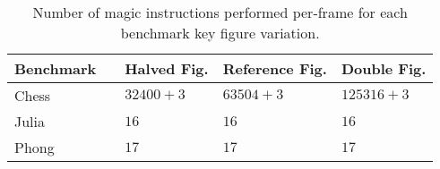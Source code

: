 
\begin{table}
\centering

\begin{tabular}{lllll}
	Benchmark	& \hspace{3.6cm} & Halved Fig.	& Reference Fig.	& Double Fig.	\\ \hline
	Chess		& \hspace{3.6cm} & $32400+3$	& $63504+3$			& $125316+3$	\\
	Julia		& \hspace{3.6cm} & $16$			& $16$				& $16$			\\
	Phong		& \hspace{3.6cm} & $17$ 		& $17$ 				& $17$			\\
\end{tabular} %

\caption{Number of magic instructions performed per-frame for each benchmark key figure variation.}
\label{tab:keyvalsmagicinstructions}

\end{table}
